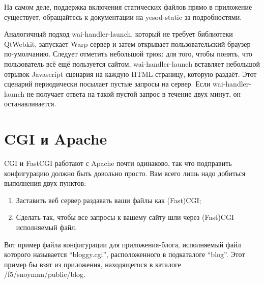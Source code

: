 На самом деле, поддержка включения статических файлов прямо в приложение существует, обращайтесь к документации на yesod-static за подробностями.
%

Аналогичный подход wai-handler-launch, который не требует библиотеки QtWebkit, запускает Warp сервер и затем открывает пользовательский браузер по-умолчанию. Следует отметить небольшой трюк: для того, чтобы понять, что пользователь всё ещё пользуется сайтом, wai-handler-launch вставляет небольшой отрывок Javascript сценария на каждую HTML страницу, которую раздаёт. Этот сценарий периодически посылает пустые запросы на сервер. Если wai-handler-launch не получает ответа на такой пустой запрос в течение двух минут, он останавливается.
%

\section{CGI и Apache}
%
%

CGI и FastCGI работают с Apache почти одинаково, так что подправить конфигурацию должно быть довольно просто. Вам всего лишь надо добиться выполнения двух пунктов:
\begin{enumerate}
  \item Заставить веб сервер раздавать ваши файлы как (Fast)CGI;
  \item Сделать так, чтобы все запросы к вашему сайту шли через (Fast)CGI исполняемый файл.
\end{enumerate}

%
Вот пример файла конфигурации для приложения-блога, исполняемый файл которого называется ``bloggy.cgi'', расположенного в подкаталоге ``blog''. Этот пример бы взят из приложения, находящегося в каталоге /f5/snoyman/public/blog.

